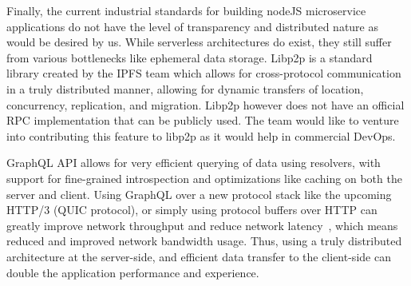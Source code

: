 Finally, the current industrial standards for building nodeJS microservice applications do not have the level of transparency and distributed nature as would be desired by us. While serverless architectures do exist, they still suffer from various bottlenecks like ephemeral data storage. 
Libp2p is a standard library created by the IPFS team which allows for cross-protocol communication in a truly distributed manner, 
allowing for dynamic transfers of location, concurrency, replication, and migration. Libp2p however does not have an official RPC implementation that can be publicly used. The team would like to venture into contributing this feature to libp2p as it would help in commercial DevOps.

GraphQL API allows for very efficient querying of data using resolvers, with support for fine-grained introspection and optimizations like caching on both the server and client. Using GraphQL over a new protocol stack like the upcoming HTTP/3 (QUIC protocol), or simply using protocol buffers over 
HTTP can greatly improve network throughput and reduce network latency~\cite{ModifiedQUIC}, which means reduced and improved network bandwidth usage. Thus, using a truly distributed architecture at the server-side, and efficient data transfer to the client-side can double the application performance and experience.